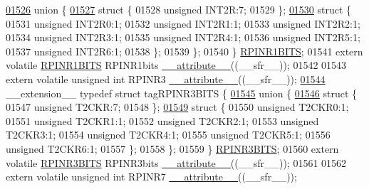 \begin{DoxyCode}
\hypertarget{a00009_source_l01526}{}\hyperlink{a00009}{01526}   \textcolor{keyword}{union }\{
\hypertarget{a00009_source_l01527}{}\hyperlink{a00009}{01527}     \textcolor{keyword}{struct }\{
01528       \textcolor{keywordtype}{unsigned} INT2R:7;
01529     \};
\hypertarget{a00009_source_l01530}{}\hyperlink{a00009}{01530}     \textcolor{keyword}{struct }\{
01531       \textcolor{keywordtype}{unsigned} INT2R0:1;
01532       \textcolor{keywordtype}{unsigned} INT2R1:1;
01533       \textcolor{keywordtype}{unsigned} INT2R2:1;
01534       \textcolor{keywordtype}{unsigned} INT2R3:1;
01535       \textcolor{keywordtype}{unsigned} INT2R4:1;
01536       \textcolor{keywordtype}{unsigned} INT2R5:1;
01537       \textcolor{keywordtype}{unsigned} INT2R6:1;
01538     \};
01539   \};
01540 \} \hyperlink{a00008_d7/d7e/a00709}{RPINR1BITS};
01541 \textcolor{keyword}{extern} \textcolor{keyword}{volatile} \hyperlink{a00008_d7/d7e/a00709}{RPINR1BITS} RPINR1bits \hyperlink{a00009_a493c46f03454991ccc5aa7a6e1dfb2a7}{\_\_attribute\_\_}((\_\_sfr\_\_));
01542 
01543 \textcolor{keyword}{extern} \textcolor{keyword}{volatile} \textcolor{keywordtype}{unsigned} \textcolor{keywordtype}{int}  RPINR3 \hyperlink{a00009_a493c46f03454991ccc5aa7a6e1dfb2a7}{\_\_attribute\_\_}((\_\_sfr\_\_));
\hypertarget{a00009_source_l01544}{}\hyperlink{a00008}{01544} \_\_extension\_\_ \textcolor{keyword}{typedef} \textcolor{keyword}{struct }tagRPINR3BITS \{
\hypertarget{a00009_source_l01545}{}\hyperlink{a00009}{01545}   \textcolor{keyword}{union }\{
\hypertarget{a00009_source_l01546}{}\hyperlink{a00009}{01546}     \textcolor{keyword}{struct }\{
01547       \textcolor{keywordtype}{unsigned} T2CKR:7;
01548     \};
\hypertarget{a00009_source_l01549}{}\hyperlink{a00009}{01549}     \textcolor{keyword}{struct }\{
01550       \textcolor{keywordtype}{unsigned} T2CKR0:1;
01551       \textcolor{keywordtype}{unsigned} T2CKR1:1;
01552       \textcolor{keywordtype}{unsigned} T2CKR2:1;
01553       \textcolor{keywordtype}{unsigned} T2CKR3:1;
01554       \textcolor{keywordtype}{unsigned} T2CKR4:1;
01555       \textcolor{keywordtype}{unsigned} T2CKR5:1;
01556       \textcolor{keywordtype}{unsigned} T2CKR6:1;
01557     \};
01558   \};
01559 \} \hyperlink{a00008_d2/db1/a00730}{RPINR3BITS};
01560 \textcolor{keyword}{extern} \textcolor{keyword}{volatile} \hyperlink{a00008_d2/db1/a00730}{RPINR3BITS} RPINR3bits \hyperlink{a00009_a493c46f03454991ccc5aa7a6e1dfb2a7}{\_\_attribute\_\_}((\_\_sfr\_\_));
01561 
01562 \textcolor{keyword}{extern} \textcolor{keyword}{volatile} \textcolor{keywordtype}{unsigned} \textcolor{keywordtype}{int}  RPINR7 \hyperlink{a00009_a493c46f03454991ccc5aa7a6e1dfb2a7}{\_\_attribute\_\_}((\_\_sfr\_\_));

\end{DoxyCode}
